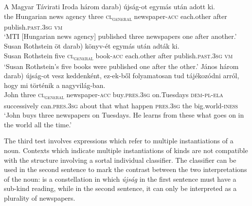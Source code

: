 \documentclass[output=paper]{langscibook}
\begin{document}
\ea \label{schv-nem:ex:13}
\gll  A Magyar Távirati Iroda három \minsp{(*} darab) újság-ot egymás után adott ki. \\
the Hungarian news agency three {} \textsc{cl\textsubscript{general}} newspaper-\textsc{acc} each.other after publish.\textsc{past}.\textsc{3sg} \textsc{vm}\\
\glt `MTI [Hungarian news agency] %
published three newspapers one after another.'
\ex \label{schv-nem:ex:14}
\gll  Susan Rothstein öt \minsp{(*} darab) könyv-ét egymás után adták ki. \\
 Susan Rothstein five {} \textsc{cl\textsubscript{general}} book-\textsc{acc} each.other after publish.\textsc{past}.\textsc{3sg} \textsc{vm} \\
\glt `Susan Rothstein’s five books were published one after the other.'
\ex \label{schv-nem:ex:15}
\gll János három \minsp{(*} darab) újság-ot vesz keddenként, ez-ek-ből folyamatosan tud tájékozódni arról, hogy mi történik a nagyvilág-ban. \\
John three {} \textsc{cl\textsubscript{general}} newspaper-\textsc{acc} buy.\textsc{pres}.\textsc{3sg} on.Tuesdays   \textsc{dem}-\textsc{pl}-\textsc{ela} successively can.\textsc{pres}.\textsc{3sg} about that what happen \textsc{pres}.\textsc{3sg} the big.world-\textsc{iness}\\
\glt `John buys three newspapers on Tuesdays. He learns from these what goes on in the world all the time.'
\z

\noindent The third test involves expressions which refer to multiple instantiations of a noun. Contexts which indicate multiple instantiations of kinds are not compatible with the structure involving a sortal individual classifier. The classifier can be used in the second sentence to mark the contrast between the two interpretations of the noun:  is a constellation in which \textit{újság} in the first sentence must have a sub-kind reading, while in the second sentence, it can only be interpreted as a plurality of newspapers. 
\end{document}
